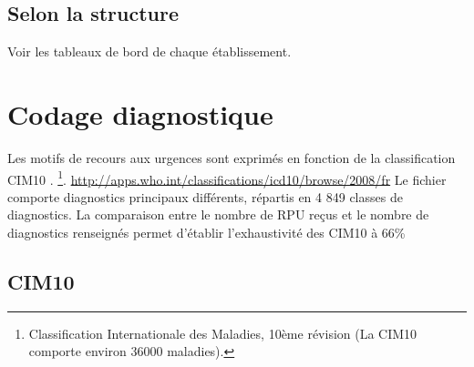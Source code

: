 \documentclass[12pt,english,french,twoside]{book}\usepackage[]{graphicx}\usepackage[]{color}
\begin{document}

\section{Selon la structure}

Voir les tableaux de bord de chaque établissement.

% 
% 
% 
% 
% 



\newpage
\chapter{Codage diagnostique}

%




Les motifs de recours aux urgences sont exprimés en fonction de la classification CIM10 \cite{10}.
\footnote{Classification Internationale des Maladies, 10ème révision (La CIM10 comporte environ 36000 maladies).}.
\url{http://apps.who.int/classifications/icd10/browse/2008/fr}
Le fichier comporte  diagnostics principaux différents, 
répartis en 4 849 classes de diagnostics.
La comparaison entre le nombre de RPU reçus et le nombre de diagnostics renseignés permet d'établir l'exhaustivité des CIM10 à 66\% 


\section{CIM10}
\end{document}
